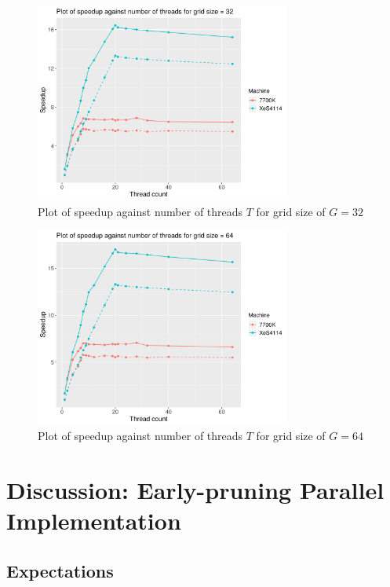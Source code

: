 \documentclass[12pt]{article}
\begin{document}
\begin{figure}[H]
    \centering
    \includegraphics[width=0.75\textwidth]{optPar-gridSize32-speedup}
    \caption{Plot of speedup against number of threads $T$ for grid size of $G = 32$}
    \label{fig:optPar-gridSize32-speedup}
\end{figure}
\begin{figure}[H]
    \centering
    \includegraphics[width=0.75\textwidth]{optPar-gridSize64-speedup}
    \caption{Plot of speedup against number of threads $T$ for grid size of $G = 64$}
    \label{fig:optPar-gridSize64-speedup}
\end{figure}
\pagebreak

\section{Discussion: Early-pruning Parallel Implementation}

\subsection{Expectations}
\end{document}
